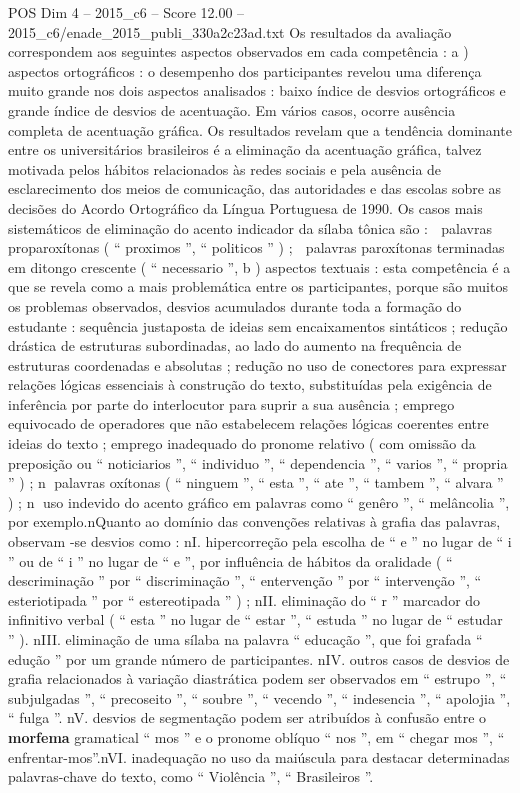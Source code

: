\begin{textsample}{POS Dim 4 – 2015\_c6 – Score 12.00 – 2015\_c6/enade\_2015\_publi\_330a2c23ad.txt}
Os resultados da avaliação correspondem aos seguintes aspectos observados em cada competência : a ) aspectos ortográficos : o desempenho dos participantes revelou uma diferença muito grande nos dois aspectos analisados : baixo índice de desvios ortográficos e grande índice de desvios de acentuação.
Em vários casos, ocorre ausência completa de acentuação gráfica.
Os resultados revelam que a tendência dominante entre os universitários brasileiros é a eliminação da acentuação gráfica, talvez motivada pelos hábitos relacionados às redes sociais e pela ausência de esclarecimento dos meios de comunicação, das autoridades e das escolas sobre as decisões do Acordo Ortográfico da Língua Portuguesa de 1990.
Os casos mais sistemáticos de eliminação do acento indicador da sílaba tônica são :  palavras proparoxítonas ( “ proximos ”, “ politicos ” ) ;  palavras paroxítonas terminadas em ditongo crescente ( “ necessario ”, b ) aspectos textuais : esta competência é a que se revela como a mais problemática entre os participantes, porque são muitos os problemas observados, desvios acumulados durante toda a formação do estudante : sequência justaposta de ideias sem encaixamentos sintáticos ; redução drástica de estruturas subordinadas, ao lado do aumento na frequência de estruturas coordenadas e absolutas ; redução no uso de conectores para expressar relações lógicas essenciais à construção do texto, substituídas pela exigência de inferência por parte do interlocutor para suprir a sua ausência ; emprego equivocado de operadores que não estabelecem relações lógicas coerentes entre ideias do texto ; emprego inadequado do pronome relativo ( com omissão da preposição ou “ noticiarios ”, “ individuo ”, “ dependencia ”, “ varios ”, “ propria ” ) ; n palavras oxítonas ( “ ninguem ”, “ esta ”, “ ate ”, “ tambem ”, “ alvara ” ) ; n uso indevido do acento gráfico em palavras como “ genêro ”, “ melâncolia ”, por exemplo.nQuanto ao domínio das convenções relativas à grafia das palavras, observam -se desvios como : nI. hipercorreção pela escolha de “ e ” no lugar de “ i ” ou de “ i ” no lugar de “ e ”, por influência de hábitos da oralidade ( “ descriminação ” por “ discriminação ”, “ entervenção ” por “ intervenção ”, “ esteriotipada ” por “ estereotipada ” ) ; nII. eliminação do “ r ” marcador do infinitivo verbal ( “ esta ” no lugar de “ estar ”, “ estuda ” no lugar de “ estudar ” ). nIII. eliminação de uma sílaba na palavra “ educação ”, que foi grafada “ edução ” por um grande número de participantes. nIV. outros casos de desvios de grafia relacionados à variação diastrática podem ser observados em “ estrupo ”, “ subjulgadas ”, “ precoseito ”, “ soubre ”, “ vecendo ”, “ indesencia ”, “ apolojia ”, “ fulga ”. nV. desvios de segmentação podem ser atribuídos à confusão entre o \textbf{morfema} gramatical “ mos ” e o pronome oblíquo “ nos ”, em “ chegar mos ”, “ enfrentar-mos”.nVI. inadequação no uso da maiúscula para destacar determinadas palavras-chave do texto, como “ Violência ”, “ Brasileiros ”.

\end{textsample}
